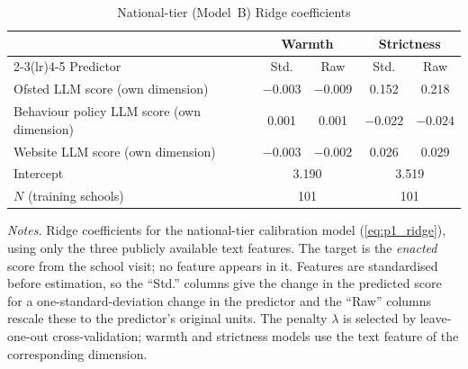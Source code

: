 \begin{table}[htbp]\centering\caption{National-tier (Model~B) Ridge coefficients}
\label{tab:national_model_coefs}

\footnotesize\setlength{\tabcolsep}{4pt}%
\begin{tabular}{lcccc}
\toprule
                    & \multicolumn{2}{c}{Warmth} & \multicolumn{2}{c}{Strictness} \\
\cmidrule(lr){2-3}\cmidrule(lr){4-5}
Predictor           & Std. & Raw & Std. & Raw \\
\midrule
Ofsted LLM score (own dimension)           & $-0.003$ & $-0.009$ & 0.152 & 0.218 \\
Behaviour policy LLM score (own dimension) & 0.001 & 0.001 & $-0.022$ & $-0.024$ \\
Website LLM score (own dimension)          & $-0.003$ & $-0.002$ & 0.026 & 0.029 \\
\midrule
Intercept & \multicolumn{2}{c}{3.190} & \multicolumn{2}{c}{3.519} \\
$N$ (training schools) & \multicolumn{2}{c}{101} & \multicolumn{2}{c}{101} \\
\bottomrule
\end{tabular}
\begin{minipage}{\textwidth}\vspace{0.5em}\footnotesize
\textit{Notes.} Ridge coefficients for the national-tier calibration model (\cref{eq:p1_ridge}), using only the three publicly available text features. The target is the \emph{enacted} score from the school visit; no feature appears in it. Features are standardised before estimation, so the ``Std.'' columns give the change in the predicted score for a one-standard-deviation change in the predictor and the ``Raw'' columns rescale these to the predictor's original units. The penalty $\lambda$ is selected by leave-one-out cross-validation; warmth and strictness models use the text feature of the corresponding dimension.
\end{minipage}
\end{table}